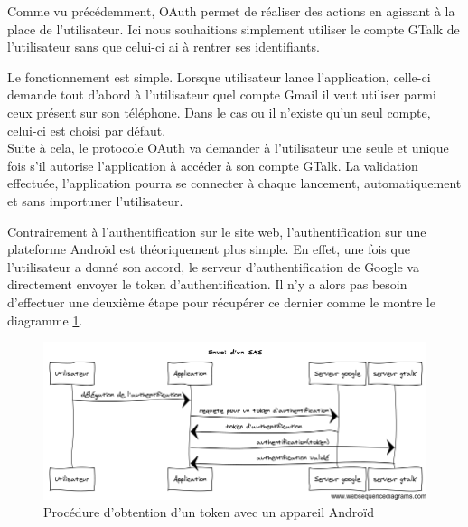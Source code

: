 Comme vu précédemment, OAuth permet de réaliser des actions en agissant à la place de l'utilisateur. 
Ici nous souhaitions simplement utiliser le compte GTalk de l'utilisateur sans que celui-ci ai à rentrer
ses identifiants. 
 
Le fonctionnement est simple. Lorsque utilisateur lance l'application, celle-ci demande tout d'abord
à l'utilisateur quel compte Gmail il veut utiliser parmi ceux présent sur son téléphone. Dans le cas
ou il n'existe qu'un seul compte, celui-ci est choisi par défaut.
\\
 
 
Suite à cela, le protocole OAuth va demander à l'utilisateur une seule et unique fois s’il autorise 
l'application à accéder à son compte GTalk. La validation effectuée, l'application pourra se connecter 
à chaque lancement, automatiquement et sans importuner l'utilisateur. 
 
 
Contrairement à l'authentification sur le site web, l'authentification sur une plateforme Androïd est
théoriquement plus simple. En effet, une fois que l'utilisateur a donné son accord, le serveur 
d'authentification de Google va directement envoyer le token d'authentification. Il n'y a alors pas 
besoin d'effectuer une deuxième étape pour récupérer ce dernier comme le montre le diagramme 
\ref{obtention-token-avec-android}.
 
 
 
\begin{figure}[!h]
  \center
  \includegraphics[width=15cm]{img/obtention-token-avec-android.png}
  \caption{Procédure d'obtention d'un token avec un appareil Androïd}
  \label{obtention-token-avec-android}
\end{figure}
 
